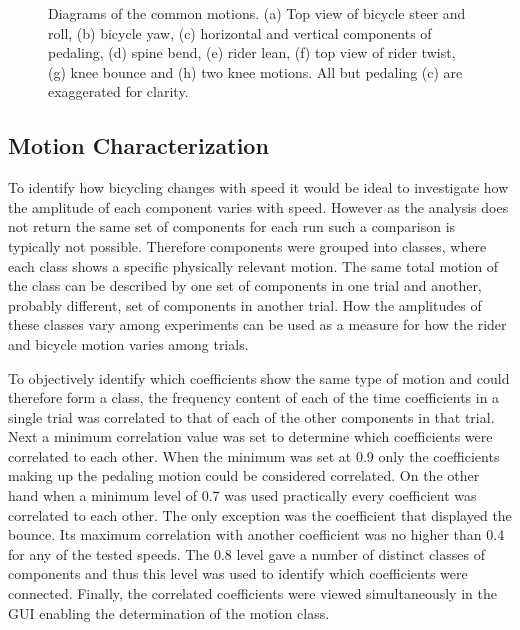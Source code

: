 \begin{figure}[tbp]
    \begin{center}
        \qquad
        \qquad
        \qquad

        \qquad
        \qquad
        \qquad
    \end{center}
    \caption{Diagrams of the common motions. (a) Top view of bicycle steer
    and roll, (b) bicycle yaw, (c) horizontal and vertical components
    of pedaling, (d) spine bend, (e) rider lean, (f) top view of rider
    twist, (g) knee bounce and (h) two knee motions. All but pedaling (c) are
    exaggerated for clarity.}
    \label{fig:motions}
\end{figure}

\subsection{Motion Characterization}
\label{sec:motionChar}
To identify how bicycling changes with speed it would be ideal to investigate
how the amplitude of each component varies with speed. However as the analysis
does not return the same set of components for each run such a comparison is
typically not possible. Therefore components were grouped into classes, where
each class shows a specific physically relevant motion. The same total motion
of the class can be described by one set of components in one trial and
another, probably different, set of components in another trial. How the
amplitudes of these classes vary among experiments can be used as a
measure for how the rider and bicycle motion varies among trials.

To objectively identify which coefficients show the same type of motion and
could therefore form a class, the frequency content of each of the time
coefficients in a single trial was correlated to that of each of the other
components in that trial. Next a minimum correlation value was set to determine
which coefficients were correlated to each other. When the minimum was set at
0.9 only the coefficients making up the pedaling motion could be considered
correlated. On the other hand when a minimum level of 0.7 was used practically
every coefficient was correlated to each other. The only exception was the
coefficient that displayed the bounce. Its maximum correlation with another
coefficient was no higher than 0.4 for any of the tested speeds. The 0.8 level
gave a number of distinct classes of components and thus this level was used to
identify which coefficients were connected. Finally, the correlated
coefficients were viewed simultaneously in the GUI enabling the determination
of the motion class.


